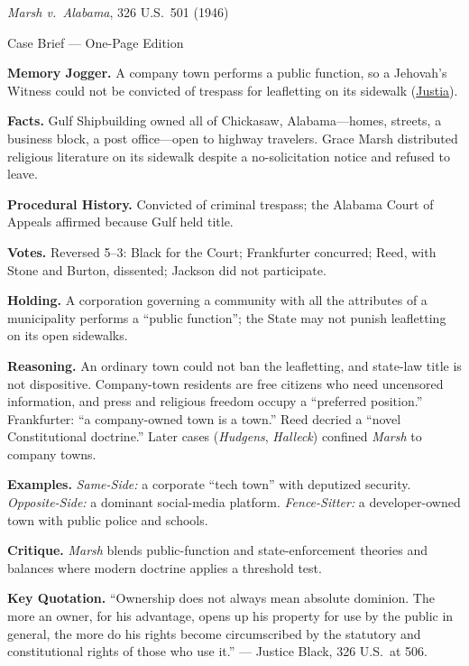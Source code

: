 \documentclass[12pt]{article}
\begin{document}
\begin{center}
{\Large \textit{Marsh v.\ Alabama}, 326 U.S.\ 501 (1946)\par}
\vspace{0.3em}
{\normalsize Case Brief --- One-Page Edition\par}
\end{center}

\textbf{Memory Jogger.} A company town performs a public function, so a Jehovah's Witness could not be convicted of trespass for leafletting on its sidewalk (\href{https://supreme.justia.com/cases/federal/us/326/501/}{Justia}).

\textbf{Facts.} Gulf Shipbuilding owned all of Chickasaw, Alabama---homes, streets, a business block, a post office---open to highway travelers. Grace Marsh distributed religious literature on its sidewalk despite a no-solicitation notice and refused to leave.

\textbf{Procedural History.} Convicted of criminal trespass; the Alabama Court of Appeals affirmed because Gulf held title.

\textbf{Votes.} Reversed 5--3: Black for the Court; Frankfurter concurred; Reed, with Stone and Burton, dissented; Jackson did not participate.

\textbf{Holding.} A corporation governing a community with all the attributes of a municipality performs a ``public function''; the State may not punish leafletting on its open sidewalks.

\textbf{Reasoning.} An ordinary town could not ban the leafletting, and state-law title is not dispositive. Company-town residents are free citizens who need uncensored information, and press and religious freedom occupy a ``preferred position.'' Frankfurter: ``a company-owned town is a town.'' Reed decried a ``novel Constitutional doctrine.'' Later cases (\textit{Hudgens}, \textit{Halleck}) confined \textit{Marsh} to company towns.

\textbf{Examples.} \emph{Same-Side:} a corporate ``tech town'' with deputized security. \emph{Opposite-Side:} a dominant social-media platform. \emph{Fence-Sitter:} a developer-owned town with public police and schools.

\textbf{Critique.} \textit{Marsh} blends public-function and state-enforcement theories and balances where modern doctrine applies a threshold test.

\textbf{Key Quotation.} ``Ownership does not always mean absolute dominion. The more an owner, for his advantage, opens up his property for use by the public in general, the more do his rights become circumscribed by the statutory and constitutional rights of those who use it.'' --- Justice Black, 326 U.S.\ at 506.
\end{document}
